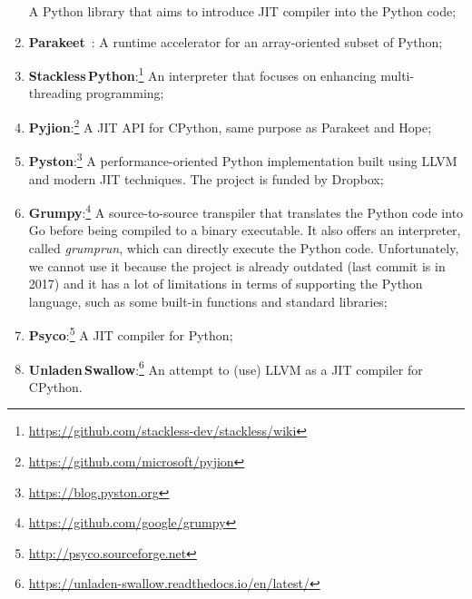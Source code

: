 \begin{enumerate}
            A Python library that aims to introduce JIT compiler into the Python code;
      \item \textbf{Parakeet}~\cite{rubinsteyn2012parakeet}:
            A runtime accelerator for an array-oriented subset of Python;
      \item \textbf{Stackless\,Python}:\footnote{\url{https://github.com/stackless-dev/stackless/wiki}}
            An interpreter that focuses on enhancing multi-threading programming;
      \item \textbf{Pyjion}:\footnote{\url{https://github.com/microsoft/pyjion}}
            A JIT API for CPython, same purpose as Parakeet and Hope;
      \item \textbf{Pyston}:\footnote{\url{https://blog.pyston.org}}
            A performance-oriented Python implementation built using LLVM and modern JIT techniques.
            The project is funded by Dropbox;
      \item \textbf{Grumpy}:\footnote{\url{https://github.com/google/grumpy}}
            A source-to-source transpiler that translates the Python code into Go before being compiled to a binary executable.
            It also offers an interpreter, called \emph{grumprun}, which can directly execute the Python code.
            Unfortunately, we cannot use it because the project is already outdated (last commit is in 2017) and it has a lot of limitations in terms of supporting the Python language, such as some built-in functions and standard libraries;
      \item \textbf{Psyco}:\footnote{\url{http://psyco.sourceforge.net}}
            A JIT compiler for Python;
      \item \textbf{Unladen\,Swallow}:\footnote{\url{https://unladen-swallow.readthedocs.io/en/latest/}}
            An attempt to (use) LLVM as a JIT compiler for CPython.
\end{enumerate}


